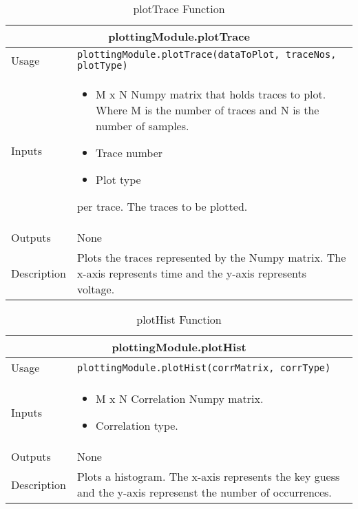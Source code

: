 \begin{table}
\caption{plotTrace Function}
\begin{tabular}{ |p{2cm}||p{11cm}|  }
 \hline
 \multicolumn{2}{|c|}{\textbf{plottingModule.plotTrace}} \\
 \hline
 Usage & \texttt{plottingModule.plotTrace(dataToPlot, traceNos, plotType)}\\ \hline
 Inputs &  \begin{itemize}
 		   \item M x N Numpy matrix that holds traces to plot. Where M is the number of traces and N is the number of samples.
 		   \item Trace number
 		   \item Plot type
 		   \end{itemize}
per trace.
The traces to be plotted.
  \\ \hline
 Outputs & None \\ \hline
 Description & Plots the traces represented by the Numpy matrix. The x-axis represents time and the y-axis represents voltage. \\ \hline
\end{tabular}
\end{table}

\begin{table}
\caption{plotHist Function}
\begin{tabular}{ |p{2cm}||p{11cm}|  }
 \hline
 \multicolumn{2}{|c|}{\textbf{plottingModule.plotHist}} \\
 \hline
 Usage & \texttt{plottingModule.plotHist(corrMatrix, corrType)}\\ \hline
 Inputs &  \begin{itemize}
 		   \item M x N Correlation Numpy matrix. 
 		   \item Correlation type.
 		   \end{itemize}  \\ \hline
 Outputs & None \\ \hline
 Description & Plots a histogram. The x-axis represents the key guess and the y-axis represenst the number of occurrences.
 \\ \hline
\end{tabular}
\end{table}


